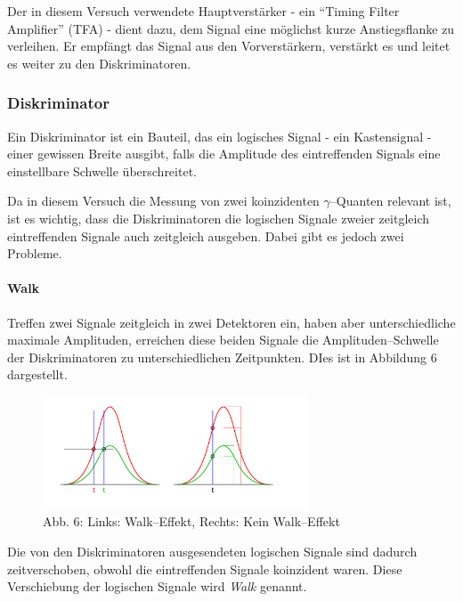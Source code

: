 \documentclass[12pt,a4paper]{scrartcl}
\numberwithin{equation}{section} %
\renewcommand{\[}{} %
\renewcommand{\]}{\noindent} %
\begin{document}
Der in diesem Versuch verwendete Hauptverstärker - ein ``Timing Filter
Amplifier'' (TFA) - dient dazu, dem Signal eine möglichst kurze
Anstiegsflanke zu verleihen. Er empfängt das Signal aus den
Vorverstärkern, verstärkt es und leitet es weiter zu den
Diskriminatoren.

\hypertarget{diskriminator}{%
\subsubsection{Diskriminator}\label{diskriminator}}

Ein Diskriminator ist ein Bauteil, das ein logisches Signal - ein
Kastensignal - einer gewissen Breite ausgibt, falls die Amplitude des
eintreffenden Signals eine einstellbare Schwelle überschreitet.

Da in diesem Versuch die Messung von zwei koinzidenten
\(\gamma\)--Quanten relevant ist, ist es wichtig, dass die
Diskriminatoren die logischen Signale zweier zeitgleich eintreffenden
Signale auch zeitgleich ausgeben. Dabei gibt es jedoch zwei Probleme.

\hypertarget{walk}{%
\paragraph{Walk}\label{walk}}

Treffen zwei Signale zeitgleich in zwei Detektoren ein, haben aber
unterschiedliche maximale Amplituden, erreichen diese beiden Signale die
Amplituden--Schwelle der Diskriminatoren zu unterschiedlichen
Zeitpunkten. DIes ist in Abbildung \(6\) dargestellt.

\begin{figure}
	\centering
	\includegraphics[width=0.7\textwidth]{../media/B3.4/Constant_fraction_1.pdf}
	\caption{Abb. 6: Links: Walk--Effekt, Rechts: Kein Walk--Effekt}
	\label{abb:Walk-Effekt}
\end{figure}

Die von den Diskriminatoren ausgesendeten logischen Signale sind dadurch
zeitverschoben, obwohl die eintreffenden Signale koinzident waren. Diese
Verschiebung der logischen Signale wird \emph{Walk} genannt.
\end{document}
